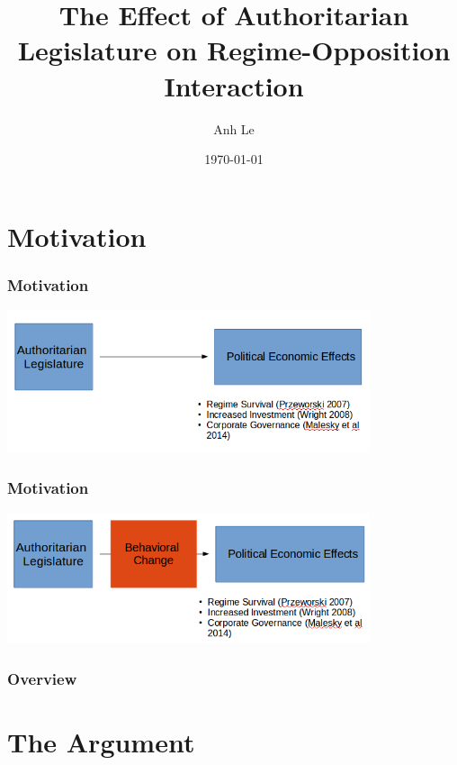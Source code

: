 \documentclass{beamer}
\title[Effect of Authoritarian Legislature]{The Effect of Authoritarian Legislature on Regime-Opposition Interaction} %
\author{Anh Le} %
\institute[Duke] %
{Duke University \\ %
\medskip
\textit{anh.le@duke.edu} %
}
\date{\today} %
\begin{document}

\begin{frame}
\titlepage %
\end{frame}

\section{Motivation}
\begin{frame}
\frametitle{Motivation}
\centering
\includegraphics[width=0.8\textwidth]{legislature_to_pe}
\end{frame}

\begin{frame}
\frametitle{Motivation}
\centering
\includegraphics[width=0.8\textwidth]{legislature_to_behavior}
\end{frame}

\begin{frame}
\frametitle{Overview}
\tableofcontents
\end{frame}


\section{The Argument}
\end{document}
